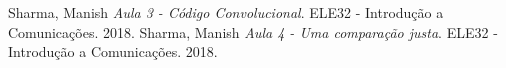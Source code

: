 \begin{thebibliography}{1}

Sharma, Manish \emph{Aula 3 - Código Convolucional}. ELE32 - Introdução a Comunicações. 2018. 
Sharma, Manish \emph{Aula 4 - Uma comparação justa}. ELE32 - Introdução a Comunicações. 2018. 

\end{thebibliography}